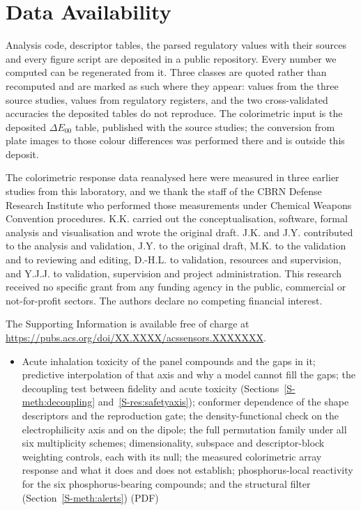 \documentclass[journal=jacsat,manuscript=article,margin=1in]{achemso}
\begin{document}
\section*{Data Availability}
Analysis code, descriptor tables, the parsed regulatory values with their
sources and every figure script are deposited in a public
repository.\cite{simulantrepo} Every number we computed can be regenerated
from it. Three classes are quoted rather than recomputed and are marked as
such where they appear: values from the three source studies, values from
regulatory registers, and the two cross-validated accuracies the deposited
tables do not reproduce. The colorimetric input is the deposited
$\Delta E_{00}$ table, published with the source studies; the conversion from
plate images to those colour differences was performed there and is outside
this deposit.

\begin{acknowledgement}
The colorimetric response data reanalysed here were measured in three earlier
studies from this laboratory\cite{hazref,multiplexref,group3ref}, and we thank
the staff of the CBRN Defense Research Institute who performed those
measurements under Chemical Weapons Convention procedures. K.K. carried out
the conceptualisation, software, formal analysis and visualisation and wrote
the original draft. J.K. and J.Y. contributed to the analysis and validation,
J.Y. to the original draft, M.K. to the validation and to reviewing and
editing, D.-H.L. to validation, resources and supervision, and Y.J.J. to
validation, supervision and project administration. This research received no
specific grant from any funding agency in the public, commercial or
not-for-profit sectors. The authors declare no competing financial interest.
\end{acknowledgement}

\begin{suppinfo}
The Supporting Information is available free of charge at
\url{https://pubs.acs.org/doi/XX.XXXX/acssensors.XXXXXXX}.
\begin{itemize}
\item Acute inhalation toxicity of the panel compounds and the gaps in it;
  predictive interpolation of that axis and why a model cannot fill the gaps;
  the decoupling test between fidelity and acute toxicity
  (Sections~\ref{S-meth:decoupling} and~\ref{S-res:safetyaxis}); conformer
  dependence of the shape descriptors and the reproduction gate; the
  density-functional check on the electrophilicity axis and on the dipole;
  the full permutation family under all six multiplicity schemes;
  dimensionality, subspace and descriptor-block weighting controls, each with
  its null; the measured colorimetric array response and what it does and does
  not establish; phosphorus-local reactivity for the six phosphorus-bearing
  compounds; and the structural filter (Section~\ref{S-meth:alerts}) (PDF)
\end{itemize}
\end{suppinfo}


\end{document}
